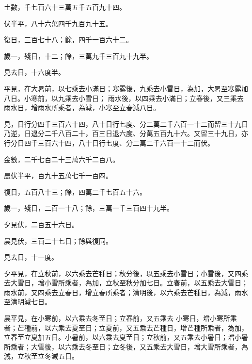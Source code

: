 \begin{pinyinscope}
 土數，千七百六十三萬五千五百九十四。



 伏半平，八十六萬四千九百九十五。



 復日，三百七十八；餘，四千一百六十二。



 歲一，殘日，十二；餘，三萬九千三百九十九半。



 見去日，十六度半。



 平見，在大暑前，以七乘去小滿日；寒露後，九乘去小雪日，為加，大暑至寒露加八日。小寒前，以九乘去小雪日；
 雨水後，以四乘去小滿日；立春後，又三乘去雨水日，增雨水所乘者，為減，小寒至立春減八日。



 見，日行分四千三百六十四，八十日行七度、分二萬二千六百一十二而留三十九日乃逆，日退分二千八百二十，百三日退六度、分萬五百九十六。又留三十九日，亦行分日四千三百六十四，八十日行七度、分二萬二千六百一十二而伏。



 金數，二千七百二十三萬六千二百八。



 晨伏半平，百九十五萬七千一百四。



 復日，五百八十三；餘，四萬二千七百五十六。



 歲一，殘日，二百一十八；餘，三萬一千三百四十九半。



 夕見伏，二百五十六日。



 晨見伏，三百二十七日；餘與復同。



 見去日，十一度。



 夕平見，在立秋前，以六乘去芒種日；秋分後，以五乘去小雪日；小雪後，又四乘去大雪日，增小雪所乘者，為加，立秋至秋分加七日。立春前，以五乘去大雪日；雨水前，又四乘去立春日，增立春所乘者；清明後，以六乘去芒種日，為減，雨水至清明減七日。



 晨平見，在小寒前，以六乘去冬至日；立春前，又五乘去
 小寒日，增小寒所乘者；芒種前，以六乘去夏至日；立夏前，又五乘去芒種日，增芒種所乘者，為加，立春至立夏加五日。小暑前，以六乘去夏至日；立秋前，又五乘去小暑日；增小暑所乘者；大雪後，以六乘去冬至日；立冬後，又五乘去大雪日，增大雪所乘者，為減，立秋至立冬減五日。




\end{pinyinscope}
